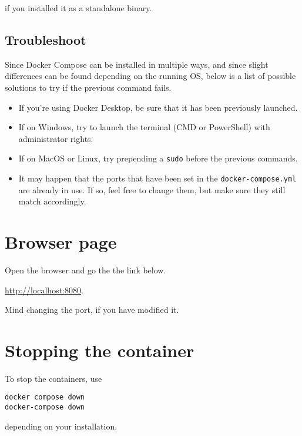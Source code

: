 if you installed it as a standalone binary.

\subsection{Troubleshoot}

Since Docker Compose can be installed in multiple ways, and since slight differences can be found depending on the running OS, below is a list of possible solutions to try if the previous command fails.

\begin{itemize}

    \item If you're using Docker Desktop, be sure that it has been previously launched.
    \item If on Windows, try to launch the terminal (CMD or PowerShell) with administrator rights.
    \item If on MacOS or Linux, try prepending a \verb|sudo| before the previous commands.
    \item It may happen that the ports that have been set in the \verb|docker-compose.yml| are already in use.
    If so, feel free to change them, but make sure they still match accordingly.

\end{itemize}

\section{Browser page}

Open the browser and go the the link below.

\begin{center}
\url{http://localhost:8080}.
\end{center}

Mind changing the port, if you have modified it.

\section{Stopping the container}

To stop the containers, use

\begin{center}
\verb|docker compose down| \\
\verb|docker-compose down|
\end{center}

depending on your installation.

